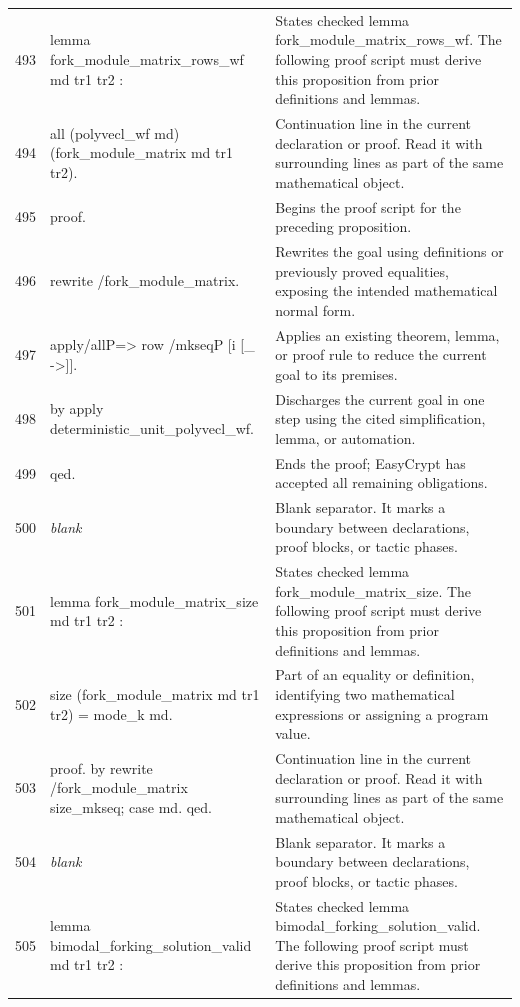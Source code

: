 \documentclass[10pt]{article}
\begin{document}
\begin{longtable}{r L{0.53\textwidth} L{0.37\textwidth}}
493 & {\ttfamily\scriptsize lemma fork\_module\_matrix\_rows\_wf md tr1 tr2 :} & States checked lemma fork\_module\_matrix\_rows\_wf.  The following proof script must derive this proposition from prior definitions and lemmas. \\
494 & {\ttfamily\scriptsize   all (polyvecl\_wf md) (fork\_module\_matrix md tr1 tr2).} & Continuation line in the current declaration or proof.  Read it with surrounding lines as part of the same mathematical object. \\
495 & {\ttfamily\scriptsize proof.} & Begins the proof script for the preceding proposition. \\
496 & {\ttfamily\scriptsize rewrite /fork\_module\_matrix.} & Rewrites the goal using definitions or previously proved equalities, exposing the intended mathematical normal form. \\
497 & {\ttfamily\scriptsize apply/allP=> row /mkseqP [i [\_ ->]].} & Applies an existing theorem, lemma, or proof rule to reduce the current goal to its premises. \\
498 & {\ttfamily\scriptsize by apply deterministic\_unit\_polyvecl\_wf.} & Discharges the current goal in one step using the cited simplification, lemma, or automation. \\
499 & {\ttfamily\scriptsize qed.} & Ends the proof; EasyCrypt has accepted all remaining obligations. \\
500 & {\ttfamily\scriptsize \emph{blank}} & Blank separator.  It marks a boundary between declarations, proof blocks, or tactic phases. \\
501 & {\ttfamily\scriptsize lemma fork\_module\_matrix\_size md tr1 tr2 :} & States checked lemma fork\_module\_matrix\_size.  The following proof script must derive this proposition from prior definitions and lemmas. \\
502 & {\ttfamily\scriptsize   size (fork\_module\_matrix md tr1 tr2) = mode\_k md.} & Part of an equality or definition, identifying two mathematical expressions or assigning a program value. \\
503 & {\ttfamily\scriptsize proof. by rewrite /fork\_module\_matrix size\_mkseq; case md. qed.} & Continuation line in the current declaration or proof.  Read it with surrounding lines as part of the same mathematical object. \\
504 & {\ttfamily\scriptsize \emph{blank}} & Blank separator.  It marks a boundary between declarations, proof blocks, or tactic phases. \\
505 & {\ttfamily\scriptsize lemma bimodal\_forking\_solution\_valid md tr1 tr2 :} & States checked lemma bimodal\_forking\_solution\_valid.  The following proof script must derive this proposition from prior definitions and lemmas. \\

\end{longtable}
\end{document}
